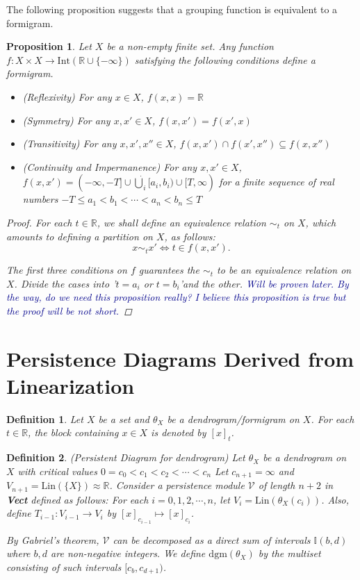 \documentclass[a4paper,12pt]{article}
\newtheorem{proposition}{Proposition}[section]
\newtheorem{definition}{Definition}[section]
\newcommand{\woojin}[1]           {{ \textcolor{darkblue} {#1}}}
\newcommand{\dgm}{\mathrm{dgm}}
\begin{document}
The following proposition suggests that a grouping function is equivalent to a formigram.
\begin{proposition} Let $X$ be a non-empty finite set. Any function $f:X\times X \rightarrow \mathrm{Int}(\mathbb{R}\cup\{-\infty\})$ satisfying the following conditions define a formigram.
\begin{itemize}
\item[1.] (Reflexivity) For any $x\in X$, $f(x,x)=\mathbb{R}$ 
\item[2.] (Symmetry) For any $x,x'\in X$, $f(x,x')=f(x',x)$
\item[3.] (Transitivity) For any $x,x',x''\in X$, $f(x,x')\cap f(x',x'')\subseteq	 f(x,x'')$

\item[4.] (Continuity and Impermanence) For any $x,x'\in X$, $f(x,x')=(-\infty, -T]\cup \dot{\bigcup}_i{[a_i, b_i)} \cup [T, \infty)$ for a finite sequence of real numbers $-T \leq a_1<b_1<\cdots<a_n<b_n\leq T$

\end{itemize}
 
\begin{proof} For each $t\in \mathbb{R}$, we shall define an  equivalence relation $\sim_{t}$ on $X$, which amounts to defining a partition on $X$, as follows: $$x\sim_t x' \Leftrightarrow t\in f(x,x').$$   

The first three conditions on $f$ guarantees the $\sim_t$ to be an equivalence relation on $X$. Divide the cases into '$t=a_i$ or $t=b_i$'and the other.\woojin{Will be proven later. By the way, do we need this proposition really? I believe this proposition is true but the proof will be not short.}

\end{proof}
\end{proposition}

\section{Persistence Diagrams Derived from Linearization}

\begin{definition} Let $X$ be a set and $\theta_X$ be a dendrogram/formigram on $X$. For each $t\in \mathbb{R}$, the block containing $x\in X$ is denoted by $[x]_t$. 
\end{definition}

\begin{definition}(Persistent Diagram for dendrogram) Let $\theta_X$ be a dendrogram on $X$ with critical values $0=c_0<c_1< c_2< \cdots <c_n$ Let $c_{n+1}=\infty$ and $V_{n+1}=\mathrm{Lin}(\{X\})\approx \mathbb{R}$. Consider a persistence module $\mathcal{V}$ of length $n+2$ in \textbf{Vect} defined as follows: For each $i=0, 1, 2,\cdots, n$, let $V_i=\mathrm{Lin}(\theta_X(c_i))$. Also, define  $T_{i-1}:V_{i-1}\rightarrow V_{i}$ by $[x]_{c_{i-1}}\mapsto [x]_{c_{i}}$.

By Gabriel's theorem, $\mathcal{V}$ can be decomposed as a direct sum of intervals $\mathbb{I}(b,d)$ where $b,d$ are non-negative integers. We define $\dgm(\theta_X)$ by the multiset consisting of such intervals $[c_b,c_{d+1})$. \label{diagram0}
\end{definition}
\end{document}

